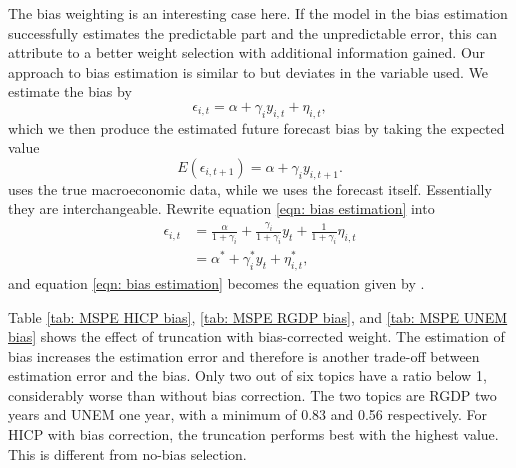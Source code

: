 \documentclass[11pt]{article}
\begin{document}
The bias weighting is an interesting case here. If the model in the bias estimation successfully estimates the predictable part and the unpredictable error, this can attribute to a better weight selection with additional information gained. Our approach to bias estimation is similar to \cite{Gibbs2017} but deviates in the variable used. We estimate the bias by
\begin{equation}
\label{eqn: bias estimation}
\epsilon_{i,t} = \alpha + \gamma_i y_{i,t} + \eta_{i,t},
\end{equation}
which we then produce the estimated future forecast bias by taking the expected value
\begin{equation}
E(\epsilon_{i,t+1}) = \alpha + \gamma_i y_{i,t+1}.
\end{equation}
\citeauthor{Gibbs2017} uses the true macroeconomic data, while we uses the forecast itself. Essentially they are interchangeable. Rewrite equation \ref{eqn: bias estimation} into
\begin{equation}
\begin{aligned}
\epsilon_{i,t} &= \frac{\alpha}{1+\gamma_i}+\frac{\gamma_i}{1+\gamma_i}y_t + \frac{1}{1+\gamma_i}\eta_{i,t}\\
&= \alpha^* + \gamma_i^* y_t + \eta_{i,t}^*,
\end{aligned} 
\end{equation}
and equation \ref{eqn: bias estimation} becomes the equation given by \citeauthor{Gibbs2017}.

Table \ref{tab: MSPE HICP bias}, \ref{tab: MSPE RGDP bias}, and \ref{tab: MSPE UNEM bias} shows the effect of truncation with bias-corrected weight. The estimation of bias increases the estimation error and therefore is another trade-off between estimation error and the bias. Only two out of six topics have a ratio below 1, considerably worse than without bias correction. The two topics are RGDP two years and UNEM one year, with a minimum of 0.83 and 0.56 respectively. For HICP with bias correction, the truncation performs best with the highest value. This is different from no-bias selection.
\end{document}
